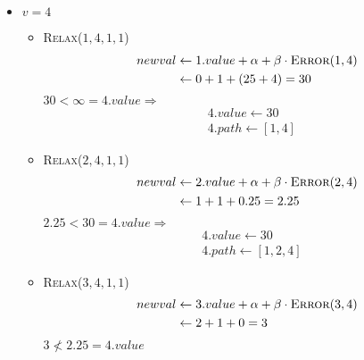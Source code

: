 \documentclass[a4paper]{scrartcl}
\begin{document}
\begin{enumerate}[(a)]
\begin{itemize}
            \item $v = 4$
                \begin{itemize}
                    \item \textsc{Relax}($1, 4, 1, 1$) \\
                        \begin{equation*}
                            \begin{split}
                                newval &\gets 1.value + \alpha + \beta \cdot \textsc{Error}(1, 4) \\
                                &\gets 0 + 1 + (25 + 4) = 30
                            \end{split}
                        \end{equation*}
                        $30 < \infty = 4.value \Rightarrow$
                        \begin{align*}
                            & 4.value \gets 30 \\
                            & 4.path \gets [1, 4]
                        \end{align*}

                    \item \textsc{Relax}($2, 4, 1, 1$) \\
                        \begin{equation*}
                            \begin{split}
                                newval &\gets 2.value + \alpha + \beta \cdot \textsc{Error}(2, 4) \\
                                &\gets 1 + 1 + 0.25 = 2.25
                            \end{split}
                        \end{equation*}
                        $2.25 < 30 = 4.value \Rightarrow$
                        \begin{align*}
                            & 4.value \gets 30 \\
                            & 4.path \gets [1, 2, 4]
                        \end{align*}

                    \item \textsc{Relax}($3, 4, 1, 1$) \\
                        \begin{equation*}
                            \begin{split}
                                newval &\gets 3.value + \alpha + \beta \cdot \textsc{Error}(3, 4) \\
                                &\gets 2 + 1 + 0 = 3
                            \end{split}
                        \end{equation*}
                        $3 \not< 2.25 = 4.value$


\end{itemize}
\end{itemize}
\end{enumerate}
\end{document}
